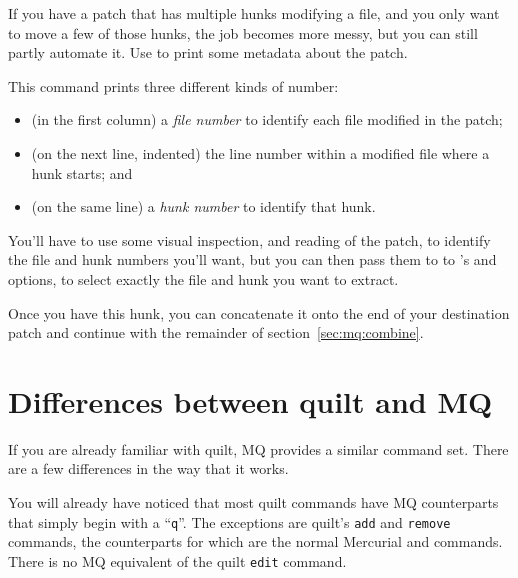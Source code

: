 If you have a patch that has multiple hunks modifying a file, and you
only want to move a few of those hunks, the job becomes more messy,
but you can still partly automate it.  Use  to
print some metadata about the patch.

This command prints three different kinds of number:
\begin{itemize}
\item (in the first column) a \emph{file number} to identify each file
  modified in the patch;
\item (on the next line, indented) the line number within a modified
  file where a hunk starts; and
\item (on the same line) a \emph{hunk number} to identify that hunk.
\end{itemize}

You'll have to use some visual inspection, and reading of the patch,
to identify the file and hunk numbers you'll want, but you can then
pass them to to 's 
and  options, to select exactly the file
and hunk you want to extract.

Once you have this hunk, you can concatenate it onto the end of your
destination patch and continue with the remainder of
section~\ref{sec:mq:combine}.

\section{Differences between quilt and MQ}

If you are already familiar with quilt, MQ provides a similar command
set.  There are a few differences in the way that it works.

You will already have noticed that most quilt commands have MQ
counterparts that simply begin with a ``\texttt{q}''.  The exceptions
are quilt's \texttt{add} and \texttt{remove} commands, the
counterparts for which are the normal Mercurial  and
 commands.  There is no MQ equivalent of the quilt
\texttt{edit} command.

